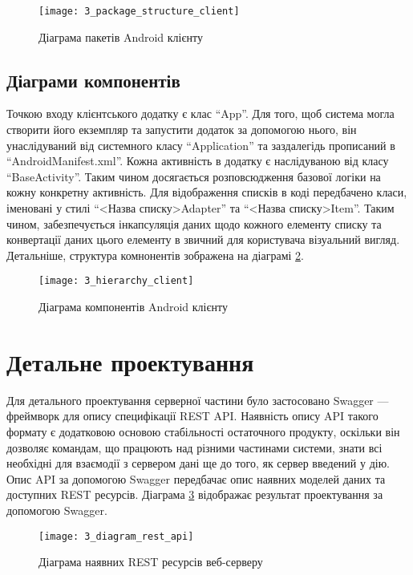\documentclass[../main.tex]{subfiles}
\begin{document}
\begin{figure}[H]
	\centering
	\texttt{[image: 3\_package\_structure\_client]}
	\caption{Діаграма пакетів Android клієнту}
	\label{client_packages}
\end{figure}

\subsection{Діаграми компонентів}

Точкою входу клієнтського додатку є клас \enquote{App}. Для того, щоб система могла створити його екземпляр та запустити додаток за допомогою нього, він унаслідуваний від системного класу \enquote{Application} та заздалегідь прописаний в \enquote{AndroidManifest.xml}. Кожна активність в додатку є наслідуваною від класу \enquote{BaseActivity}. Таким чином досягається розповсюдження базової логіки на кожну конкретну активність. Для відображення списків в коді передбачено класи, іменовані у стилі \enquote{<Назва списку>Adapter} та \enquote{<Назва списку>Item}. Таким чином, забезпечується інкапсуляція даних щодо кожного елементу списку та конвертації даних цього елементу в звичний для користувача візуальний вигляд. Детальніше, структура комнонентів зображена на діаграмі \ref{client_components}.

\begin{figure}[H]
	\centering
	\texttt{[image: 3\_hierarchy\_client]}
	\caption{Діаграма компонентів Android клієнту}
	\label{client_components}
\end{figure}

\section{Детальне проектування}

Для детального проектування серверної частини було застосовано Swagger — фреймворк для опису специфікації REST API. Наявність опису API такого формату є додатковою основою стабільності остаточного продукту, оскільки він дозволяє командам, що працюють над різними частинами системи, знати всі необхідні для взаємодії з сервером дані ще до того, як сервер введений у дію. Опис API за допомогою Swagger передбачає опис наявних моделей даних та доступних REST ресурсів. Діаграма \ref{available_rest_resources} відображає результат проектування за допомогою Swagger.

\begin{figure}[H]
	\centering
	\texttt{[image: 3\_diagram\_rest\_api]}
	\caption{Діаграма наявних REST ресурсів веб-серверу}
	\label{available_rest_resources}
\end{figure}
\end{document}

